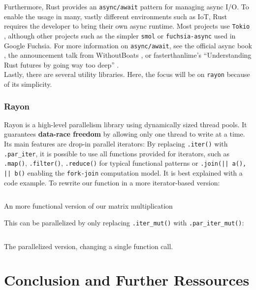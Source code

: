 Furthermore, Rust provides an \texttt{async/await} pattern for managing async \ac{I/O}. To enable the usage in many, vastly different environments such as \ac{IoT}, Rust requires the developer to bring their own async runtime. Most projects use \texttt{Tokio} \cite{tokio}, although other projects such as the simpler \texttt{smol} or \texttt{fuchsia-async} \cite{fuchsia} used in Google Fuchsia. For more information on \texttt{async/await}, see the official async book \cite{asyncbook}, the announcement talk from WithoutBoats \cite{withoutboats}, or fasterthanlime's ``Understanding Rust futures by going way too deep'' \cite{fasterthanlime}.\\

Lastly, there are several utility libraries. Here, the focus will be on \texttt{rayon} because of its simplicity.

\subsubsection{Rayon}

Rayon is a high-level parallelism library using dynamically sized thread pools. It guarantees \textbf{data-race freedom} by allowing only one thread to write at a time. Its main features are drop-in parallel iterators: By replacing \texttt{.iter()} with \texttt{.par\_iter}, it is possible to use all functions provided for iterators, such as \texttt{.map()}, \texttt{.filter()}, \texttt{.reduce()} for typical functional patterns or \texttt{.join(|| a(), || b()} enabling the \texttt{fork-join} computation model.
It is best explained with a code example. To rewrite our function in a more iterator-based version:

\begin{listing}[H]
  \inputminted{rust}{./assets/02rayon.rs}
\caption{An more functional version of our matrix multiplication}
\end{listing}

This can be parallelized by only replacing \texttt{.iter\_mut()} with \texttt{.par\_iter\_mut()}:

\begin{listing}[H]
  \inputminted{rust}{./assets/03rayon.rs}
\caption{The parallelized version, changing a single function call.}
\end{listing}

\section{Conclusion and Further Ressources}

